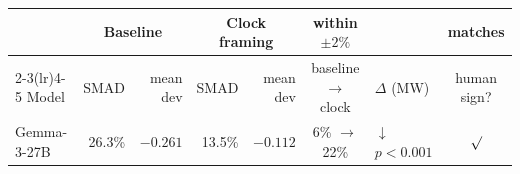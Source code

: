 \begin{tabular}{l rr rr c l c}
\toprule
 & \multicolumn{2}{c}{Baseline} & \multicolumn{2}{c}{Clock framing} & within $\pm2\%$ & & matches \\
\cmidrule(lr){2-3}\cmidrule(lr){4-5}
Model & SMAD & mean dev & SMAD & mean dev & baseline $\to$ clock & $\Delta$ (MW) & human sign? \\
\midrule
Gemma-3-27B & 26.3\% & $-0.261$ & 13.5\% & $-0.112$ & 6\% $\to$ 22\% & $\downarrow$ {\scriptsize $p<0.001$} & $\surd$ \\
\bottomrule
\end{tabular}
